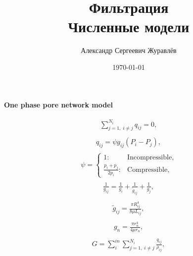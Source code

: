 \documentclass[a4paper,12pt,russian]{extreport}
\author{Александр Сергеевич Журавлёв}
\title{Фильтрация\\Численные модели}
\date{\today}
\begin{document}
\pagecolor{pageColor}
\color{fontColor}
\Russian
\printnomenclature[5em]


\begin{center}
{\large \textbf{One phase pore network model}}
\end{center}

\begin{eqnarray}
\begin{gathered}
\sum^{N_{i}}_{j=1, \; i\neq j} q_{ij} = 0,  
\end{gathered}
\end{eqnarray}
%
\begin{eqnarray}
\begin{gathered}
q_{ij} = \psi g_{ij} (P_{i} - P_{j}),  
\end{gathered}
\end{eqnarray}
%
\begin{eqnarray}
       \psi =\begin{cases}
                                                       1: &\text{Incompressible},\\
                                                        \frac{p_i + p_j}{2p_i}: &\text{Compressible},
        \end{cases}
\end{eqnarray}
%
\begin{eqnarray}
\begin{gathered}
 \frac{1}{g_{ij}}  =\frac{1}{g_i}+\frac{1}{\tilde{g}_{ij}}+\frac{1}{g_j}, 
\end{gathered}
\end{eqnarray}
%
\begin{eqnarray}
\begin{gathered}
 \tilde{g}_{ij} =\frac{\pi R_{ij}^{4}}{8 \mu L_{ij}}, 
\end{gathered}
\end{eqnarray}
%
\begin{eqnarray}
\begin{gathered}
 g_{n} =\frac{\pi r_{n}^{4}}{4 \mu r_{n}}, 
\end{gathered}
\end{eqnarray}
%
\begin{eqnarray}
\begin{gathered}
G = \sum_{i}^{in} \sum^{N_{i}}_{j=1, \; i\neq j} \frac{q_{ij}}{\bar{\rho}_{ij}},
\end{gathered}
\end{eqnarray}
\end{document}
